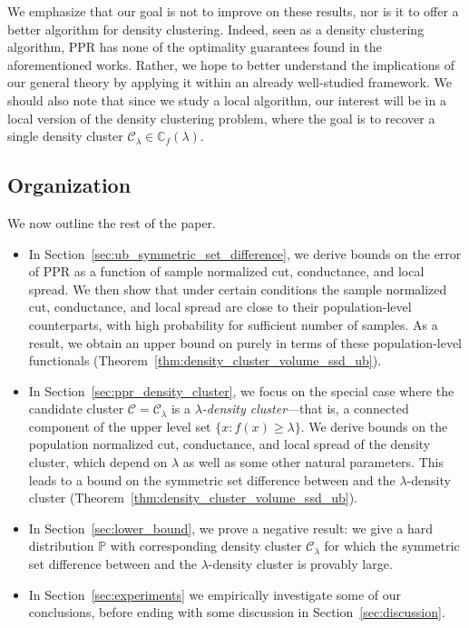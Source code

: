 \documentclass[11pt,twoside]{article}
\newcommand{\1}{\mathbf{1}}
\newcommand{\mc}[1]{\mathcal{#1}}
\newcommand{\mbb}[1]{\mathbb{#1}}
\newcommand{\Pbb}{\mathbb{P}}
\newcommand{\wh}[1]{\widehat{#1}}
\newcommand{\vol}{\mathrm{vol}}
\begin{document}
We emphasize that our goal is not to improve on these results, nor is it to offer a better algorithm for density clustering. Indeed, seen as a density clustering algorithm, PPR has none of the optimality guarantees found in the aforementioned works. Rather, we hope to better understand the implications of our general theory by applying it within an already well-studied framework. We should also note that since we study a local algorithm, our interest will be in a local version of the density clustering problem, where the goal is to recover a single density cluster $\mc{C}_{\lambda} \in \mbb{C}_f(\lambda)$. 

\subsection{Organization}
We now outline the rest of the paper.
\begin{itemize}
	\item In Section~\ref{sec:ub_symmetric_set_difference}, we derive bounds on the error of PPR as a function of sample normalized cut, conductance, and local spread. We then show that under certain conditions the sample normalized cut, conductance, and local spread are close to their population-level counterparts, with high probability for sufficient number of samples. As a result, we obtain an upper bound on \smash{$\Delta(\wh{C},\mc{C}[X])/\vol_{n,r}(\mc{C}[X])$} purely in terms of these population-level functionals (Theorem~\ref{thm:density_cluster_volume_ssd_ub}).
	\item In Section~\ref{sec:ppr_density_cluster}, we focus on the special case where the candidate cluster $\mc{C} = \mc{C}_{\lambda}$ is a \emph{$\lambda$-density cluster}---that is, a connected component of the upper level set $\{x: f(x) \geq \lambda\}$. We derive bounds on the population normalized cut, conductance, and local spread of the density cluster, which depend on $\lambda$ as well as some other natural parameters. This leads to a bound on the symmetric set difference between \smash{$\wh{C}$} and the $\lambda$-density cluster (Theorem~\ref{thm:density_cluster_volume_ssd_ub}).
	\item In Section~\ref{sec:lower_bound}, we prove a negative result: we give a hard distribution $\Pbb$ with corresponding density cluster $\mc{C}_{\lambda}$ for which the symmetric set difference between \smash{$\wh{C}$} and the $\lambda$-density cluster is provably large.
	\item In Section~\ref{sec:experiments} we empirically investigate some of our conclusions, before ending with some discussion in Section~\ref{sec:discussion}.
\end{itemize}
\end{document}
